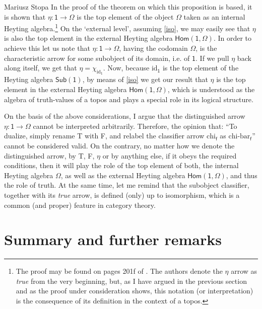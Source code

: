 \begin{artengenv}{Mariusz Stopa}
In the proof of the theorem on which this proposition is based, it is shown that $ \eta:\textsf{1}\to\Omega $ is the top element of the object $ \Omega $ taken as an internal Heyting algebra.\footnote{The proof may be found on pages 201f of \parencite{maclane-moerdijk-1994}. The authors denote the $ \eta $ arrow as \textit{true} from the very beginning, but, as I have argued in the previous section and as the proof under consideration shows, this notation (or interpretation) is the consequence of its definition in the context of a topos.} On the `external level', assuming \eqref{iso}, we may easily see that $ \eta $ is also the top element in the external Heyting algebra $ \textsf{Hom}(\textsf{1},\Omega) $. In order to achieve this let us note that $ \eta:\textsf{1}\to\Omega $, having the codomain $ \Omega $, is the characteristic arrow for some subobject of its domain, i.e. of $ \textsf{1} $. If we pull $ \eta $ back along itself, we get that $ \eta=\chi_{\text{id}_\textsf{1}} $. Now, because $ \text{id}_\textsf{1} $ is the top element of the Heyting algebra $ \textsf{Sub}(\textsf{1}) $, by means of \eqref{iso} we get our result that $ \eta $ is the top element in the external Heyting algebra $ \textsf{Hom}(\textsf{1},\Omega) $, which is understood as the algebra of truth-values of a topos and plays a special role in its logical structure.

On the basis of the above considerations, I argue that the distinguished arrow $ \eta: \textsf{1} \to \Omega $ cannot be interpreted arbitrarily. Therefore, the opinion that: ``To dualize, simply rename \textsf{T} with \textsf{F}, and relabel the classifier arrow $\text{chi}_\textsf{f}$ as $\text{chi-bar}_\textsf{f}$''  \parencite[see][p.259]{mortensen-2003} cannot be considered valid. On the contrary, no matter how we denote the distinguished arrow, by \textsf{T}, \textsf{F}, $ \eta $ or by anything else, if it obeys the required conditions, then it will play the role of the top element of both, the internal Heyting algebra $ \Omega $, as well as the external Heyting algebra $ \textsf{Hom}(\textsf{1},\Omega) $, and thus the role of truth. At the same time, let me remind that the subobject classifier, together with its \textit{true} arrow, is defined (only) up to isomorphism, which is a common (and proper) feature in category theory.



\section{Summary and further remarks}
\label{summary}


\end{artengenv}
